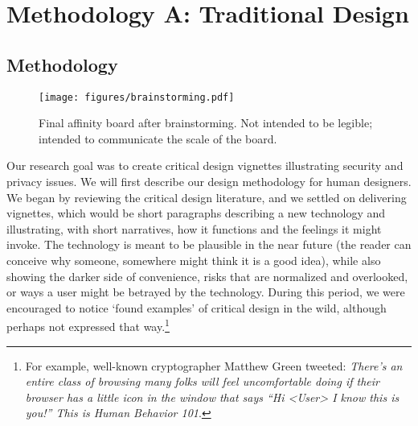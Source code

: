 
\section{Methodology A: Traditional Design}
\label{sec:meth1}

\subsection{Methodology}

\begin{figure}[t]
\begin{center}
\texttt{[image: figures/brainstorming.pdf]}
\caption{Final affinity board after brainstorming. Not intended to be legible; intended to communicate the scale of the board.\label{fig:board}}
\end{center}
\end{figure}


Our research goal was to create critical design vignettes illustrating security and privacy issues. We will first describe our design methodology for human designers. We began by reviewing the critical design literature, and we settled on delivering vignettes, which would be short paragraphs describing a new technology and illustrating, with short narratives, how it functions and the feelings it might invoke. The technology is meant to be plausible in the near future (the reader can conceive why someone, somewhere might think it is a good idea), while also showing the darker side of convenience, risks that are normalized and overlooked, or ways a user might be betrayed by the technology. During this period, we were encouraged to notice `found examples' of critical design in the wild, although perhaps not expressed that way.\footnote{For example, well-known cryptographer Matthew Green tweeted: \textit{There’s an entire class of browsing many folks will feel uncomfortable doing if their browser has a little icon in the window that says “Hi <User> I know this is you!” This is Human Behavior 101}.}

